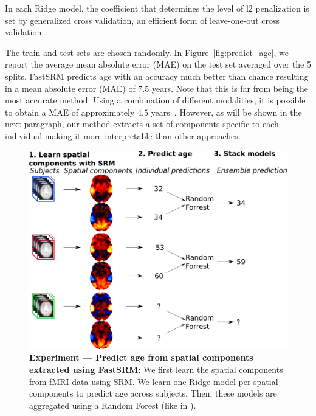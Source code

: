 In each Ridge model, the coefficient that determines the level of l2 penalization is set by generalized cross validation, an efficient form of leave-one-out cross validation.

The train and test sets are chosen randomly. In Figure~\ref{fig:predict_age}, we report the average mean absolute error (MAE) on the test set averaged over the 5 splits.
FastSRM predicts age with an accuracy much better than chance resulting in a
mean absolute error (MAE) of $7.5$ years. Note that this is far from being the
most accurate method. Using a combination of different modalities, it is
possible to obtain a MAE of approximately $4.5$
years~\cite{engemann2019combining}. However, as will be shown in the next
paragraph, our method extracts a set of
components specific to each individual making it more interpretable than other approaches.

\begin{figure}
\centering
\includegraphics[scale=0.35]{figures/srm/conceptual_figure72.png}
\caption{\textbf{Experiment — Predict age from spatial components extracted using FastSRM}: We first learn the spatial components from fMRI data using SRM. We learn one Ridge model per spatial components to predict age across subjects. Then, these models are aggregated using a Random Forest (like in \cite{rahim2017joint}).} 
\label{fig:experiment_age_prediction}
\end{figure}


